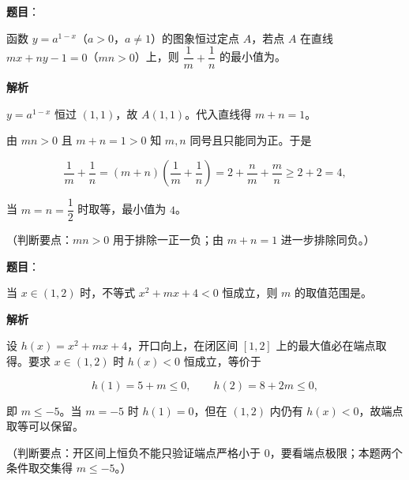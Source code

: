 \begin{answer}

\textbf{题目}：

函数 $y=a^{1-x}$（$a>0$，$a\neq1$）的图象恒过定点 $A$，若点 $A$ 在直线 $mx+ny-1=0$（$mn>0$）上，则 $\dfrac1m+\dfrac1n$ 的最小值为\gkblank{}。

\textbf{解析}

$y=a^{1-x}$ 恒过 $(1,1)$，故 $A(1,1)$。代入直线得 $m+n=1$。

由 $mn>0$ 且 $m+n=1>0$ 知 $m,n$ 同号且只能同为正。于是

\nopagebreak[4]
\[\frac1m+\frac1n=(m+n)\left(\frac1m+\frac1n\right)=2+\frac nm+\frac mn\geqslant2+2=4,\]

当 $m=n=\dfrac12$ 时取等，最小值为 $4$。

（判断要点：$mn>0$ 用于排除一正一负；由 $m+n=1$ 进一步排除同负。）


\end{answer}
\begin{answer}

\textbf{题目}：

当 $x\in(1,2)$ 时，不等式 $x^2+mx+4<0$ 恒成立，则 $m$ 的取值范围是\gkblank{}。

\textbf{解析}

设 $h(x)=x^2+mx+4$，开口向上，在闭区间 $[1,2]$ 上的最大值必在端点取得。要求 $x\in(1,2)$ 时 $h(x)<0$ 恒成立，等价于

\nopagebreak[4]
\[h(1)=5+m\leqslant0,\qquad h(2)=8+2m\leqslant0,\]

即 $m\leqslant-5$。当 $m=-5$ 时 $h(1)=0$，但在 $(1,2)$ 内仍有 $h(x)<0$，故端点取等可以保留。

（判断要点：开区间上恒负不能只验证端点严格小于 $0$，要看端点极限；本题两个条件取交集得 $m\leqslant-5$。）


\end{answer}
